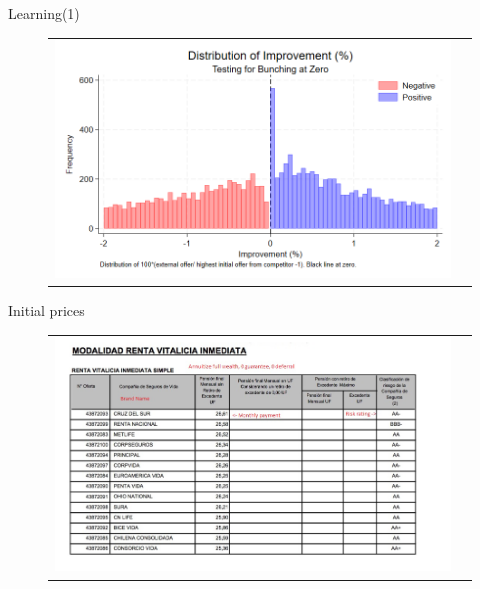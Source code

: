 \documentclass[10pt,aspectratio=169]{beamer}
\begin{document}
\begin{frame}%

\end{frame}

\begin{frame}{Learning(1)}
  \begin{figure}[H]
\caption{}
\label{fig:ie7_3}
\centering{}%
\begin{tabular}{cc}
\includegraphics[scale=0.39]{../figures/IE7/IE7_hist_bunching_max(2).png} 
\end{tabular}
\end{figure}
\end{frame}

\begin{frame}{}
\end{frame}

\begin{frame}{Initial prices}\label{slide:fig5}    
\begin{figure}[H]
\centering{}%
\begin{tabular}{cc}
\includegraphics[scale=0.49]{../figures/annuity_offer.png}
\end{tabular}
\end{figure}
\hyperlink{slide:setting}{}
\end{frame}
 
\end{document}
